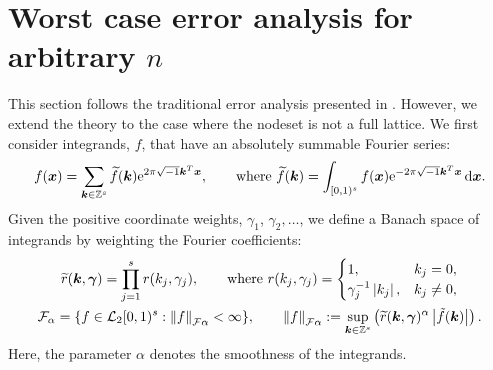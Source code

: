\documentclass[authoryear]{elsarticle}
\newcommand{\tr}{\widetilde{r}}
\begin{document}
\section{Worst case error analysis for arbitrary $n$}
This section follows the traditional error analysis presented in \cite{DicEtal22a}. However, we extend the theory to the case where the nodeset is not a full lattice. 
We first consider integrands, $f$, that have an absolutely summable Fourier series:
\begin{equation*} %
    f(\vx) = \sum_{\vk \in \integers^{s}} \tf(\vk) \me^{2 \pi \sqrt{-1} \vk^T \vx}, \qquad \text{where } \tf(\vk) = \int_{[0,1)^{s}} f(\vx) \me^{-2 \pi \sqrt{-1} \vk^T \vx}\, \dif \vx.
\end{equation*}
Given the positive coordinate weights, $\gamma_1$, $\gamma_2, \ldots$, we define a Banach space of integrands by weighting the Fourier coefficients: 
\begin{gather}
\nonumber
\tr(\vk,\vgamma) = \prod_{j=1}^{s} r(k_{j},\gamma_{j}),
\qquad \text{where } r(k_{j},\gamma_{j})=\begin{cases} 1, &
k_{j}=0, \\ \gamma_{j}^{-1}\abs{k_{j}}, & k_{j} \ne 0,  \end{cases}
\\
\label{eq:Banachspace}
\cf_{\alpha} = \{ f \in \cl_2[0,1)^{s} :
\norm[\cf{\alpha}]{f} < \infty \}, \qquad
\norm[\cf{\alpha}]{f} := \sup_{\vk \in \integers^{s}}
\left(\tr(\vk,\vgamma)^{\alpha} \abs{\tilde{f}(\vk)} \right).
\end{gather}
Here, the parameter $\alpha$ denotes the smoothness of the integrands.
\end{document}

